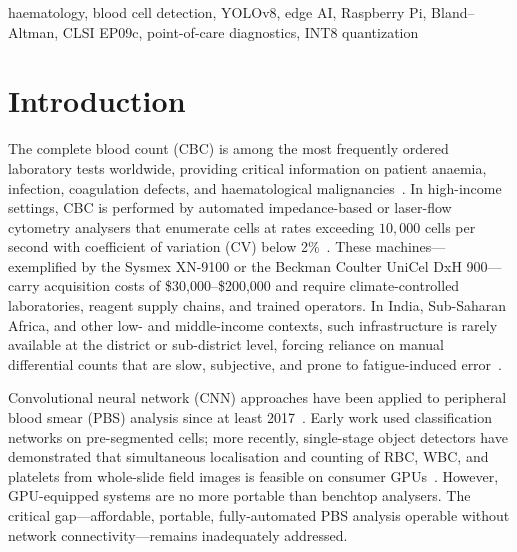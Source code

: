 \documentclass[10pt,conference]{IEEEtran}
\begin{document}
\begin{IEEEkeywords}
haematology, blood cell detection, YOLOv8, edge AI, Raspberry Pi, Bland--Altman, CLSI EP09c, point-of-care diagnostics, INT8 quantization
\end{IEEEkeywords}

\section{Introduction}
\label{sec:intro}

The complete blood count (CBC) is among the most frequently ordered laboratory tests worldwide, providing critical information on patient anaemia, infection, coagulation defects, and haematological malignancies~\cite{briggs2009}. In high-income settings, CBC is performed by automated impedance-based or laser-flow cytometry analysers that enumerate cells at rates exceeding $10{,}000$ cells per second with coefficient of variation (CV) below 2\%~\cite{horiba2022}. These machines—exemplified by the Sysmex XN-9100 or the Beckman Coulter UniCel DxH 900—carry acquisition costs of \$30,000–\$200,000 and require climate-controlled laboratories, reagent supply chains, and trained operators. In India, Sub-Saharan Africa, and other low- and middle-income contexts, such infrastructure is rarely available at the district or sub-district level, forcing reliance on manual differential counts that are slow, subjective, and prone to fatigue-induced error~\cite{who2011}.

Convolutional neural network (CNN) approaches have been applied to peripheral blood smear (PBS) analysis since at least 2017~\cite{liang2018}. Early work used classification networks on pre-segmented cells; more recently, single-stage object detectors have demonstrated that simultaneous localisation and counting of RBC, WBC, and platelets from whole-slide field images is feasible on consumer GPUs~\cite{liu2022}. However, GPU-equipped systems are no more portable than benchtop analysers. The critical gap—affordable, portable, fully-automated PBS analysis operable without network connectivity—remains inadequately addressed.
\end{document}
